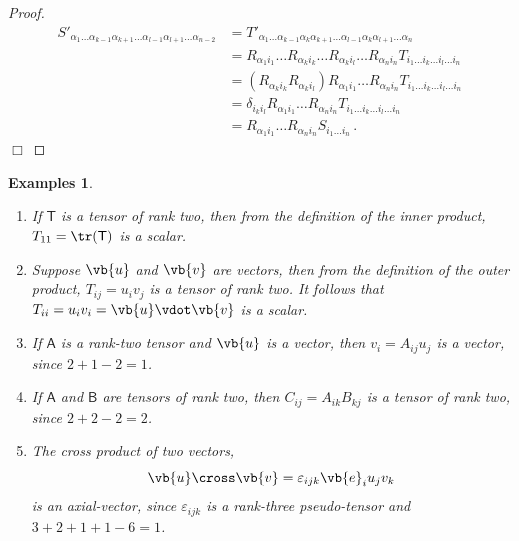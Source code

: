 \documentclass{article}
\theoremstyle{plain}\theoremheaderfont{\normalfont\itshape}\theorembodyfont{\rmfamily}\theoremseparator{.}\newtheorem*{rem}{Remark}\newtheorem*{ex}{Example}\newtheorem*{proof}{Proof}\newtheorem*{altp}{Alternative proof}
\theoremstyle{plain}\theoremheaderfont{\normalfont\bfseries}\theorembodyfont{\rmfamily}\theoremseparator{.}\newtheorem{thm}{Theorem}[section]\newtheorem{lem}[thm]{Lemma}\newtheorem{prop}[thm]{Proposition}\newtheorem*{cor}{Corollary}\newtheorem{defn}[thm]{Definition}\newtheorem{clm}[thm]{Claim}\newtheorem{clminproof}{Claim}
\theoremstyle{break}\theoremheaderfont{\normalfont\itshape}\theorembodyfont{\rmfamily}\theoremseparator{.\medskip}\newtheorem*{proofskip}{Proof}\newtheorem*{exs}{Examples}\newtheorem*{rems}{Remarks}
\theoremstyle{break}\theoremheaderfont{\normalfont\bfseries}\theorembodyfont{\rmfamily}\theoremseparator{.\medskip}\newtheorem{lemskip}[thm]{Lemma}\newtheorem{defnskip}[thm]{Definition}\newtheorem{propskip}[thm]{Proposition}\newtheorem{thmskip}[thm]{Theorem}
\numberwithin{equation}{section}
\newcommand{\qed}{\hfill\ensuremath{\Box}}
\begin{document}
	\begin{proof}
		\begin{align*}
			S'_{\alpha_1\dots\alpha_{k-1}\alpha_{k+1}\dots\alpha_{l-1}\alpha_{l+1}\dots\alpha_{n-2}}&=T'_{\alpha_1\dots\alpha_{k-1}\alpha_k\alpha_{k+1}\dots\alpha_{l-1}\alpha_k\alpha_{l+1}\dots\alpha_n}\\
			&=R_{\alpha_1i_1}\dots R_{\alpha_ki_k}\dots R_{\alpha_ki_l}\dots R_{\alpha_ni_n}T_{i_1\dots i_k\dots i_l\dots i_n}\\
			&=(R_{\alpha_ki_k}R_{\alpha_ki_l})R_{\alpha_1i_1}\dots R_{\alpha_ni_n}T_{i_1\dots i_k\dots i_l\dots i_n}\\
			&=\delta_{i_ki_l}R_{\alpha_1i_1}\dots R_{\alpha_ni_n}T_{i_1\dots i_k\dots i_l\dots i_n}\\
			&=R_{\alpha_1i_1}\dots R_{\alpha_ni_n}S_{i_1\dots i_{n}}\,.
		\end{align*}\qed
	\end{proof}
	\begin{exs}
		\begin{enumerate}[topsep=0pt]
			\item If \(\mathsf{T}\) is a tensor of rank two, then from the definition of the inner product, \(T_{11}=\tr(\mathsf{T})\) is a scalar.
			\item Suppose \(\vb{u}\) and \(\vb{v}\) are vectors, then from the definition of the outer product, \(T_{ij}=u_iv_j\) is a tensor of rank two. It follows that \(T_{ii}=u_iv_i=\vb{u}\vdot\vb{v}\) is a scalar.
			\item If \(\mathsf{A}\) is a rank-two tensor and \(\vb{u}\) is a vector, then \(v_i=A_{ij}u_j\) is a vector, since \(2+1-2=1\).
			\item If \(\mathsf{A}\) and \(\mathsf{B}\) are tensors of rank two, then \(C_{ij}=A_{ik}B_{kj}\) is a tensor of rank two, since \(2+2-2=2\).
			\item The cross product of two vectors,
			\[\vb{u}\cross\vb{v}=\varepsilon_{ijk}\vb{e}_iu_jv_k\]
			is an axial-vector, since \(\varepsilon_{ijk}\) is a rank-three pseudo-tensor and \(3+2+1+1-6=1\).
		\end{enumerate}
	\end{exs}
\end{document}
